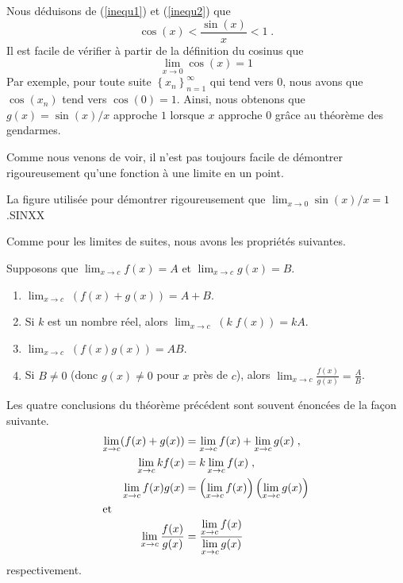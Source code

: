 {\begin{egg}[\theory]
Nous déduisons de (\ref{inequ1}) et (\ref{inequ2}) que
\[
\cos(x) < \frac{\sin(x)}{x} < 1  \; .
\]
Il est facile de vérifier à partir de la définition du cosinus que
\[
\lim_{x\rightarrow 0} \cos(x) = 1
\]
Par exemple, pour toute suite
$\displaystyle \left\{x_n\right\}_{n=1}^\infty$ qui tend vers $0$,
nous avons que $\cos(x_n)$ tend vers $\cos(0) = 1$. Ainsi, nous
obtenons que
$g(x) = \sin(x)/x$ approche $1$ lorsque $x$ approche $0$ grâce au
théorème des gendarmes.
\label{R_SINXX}
\end{egg}

Comme nous venons de voir, il n'est pas toujours facile de démontrer
rigoureusement qu'une fonction à une limite en un point.

{La figure utilisée pour démontrer rigoureusement que
$\displaystyle \lim_{x\rightarrow 0} \sin(x)/x = 1$.}{SINXX}

Comme pour les limites de suites, nous avons les propriétés suivantes.

\begin{focus}{\thm} \label{lim_funct_scd}
Supposons que $\displaystyle \lim_{x\rightarrow c} f(x) = A$ et
$\displaystyle \lim_{x\rightarrow c} g(x) = B$.
\begin{enumerate}
\item $\displaystyle \lim_{x\rightarrow c}\; (f(x) + g(x) ) = A + B$.
\item Si $k$ est un nombre réel, alors
$\displaystyle \lim_{x\rightarrow c}\; (k\; f(x)) = kA$.
\item $\displaystyle \lim_{x\rightarrow c}\; (f(x)g(x)) = AB$.
\item Si $B \neq 0$ (donc $g(x) \neq 0$ pour $x$ près de $c$),
alors $\displaystyle \lim_{x\rightarrow c} \frac{f(x)}{g(x)} = \frac{A}{B}$.
\end{enumerate}
\end{focus}

Les quatre conclusions du théorème précédent sont souvent énoncées de
la façon suivante.
\begin{align*}
\lim_{x\rightarrow c} (f(x)+g(x)) &= \lim_{x\rightarrow c} f(x) +
\lim_{x\rightarrow c} g(x) \; , \\
\lim_{x\rightarrow c} kf(x) &= k \lim_{x\rightarrow c} f(x) \; , \\
\lim_{x\rightarrow c} f(x)g(x) &= \left(\lim_{x\rightarrow c} f(x)\right) 
\left(\lim_{x\rightarrow c} g(x)\right)  \\
\intertext{et}
\lim_{x\rightarrow c} \frac{f(x)}{g(x)} &=
\frac{\displaystyle \lim_{x\rightarrow c} f(x)}
{\displaystyle \lim_{x\rightarrow c} g(x)}
\end{align*}
respectivement.

}
